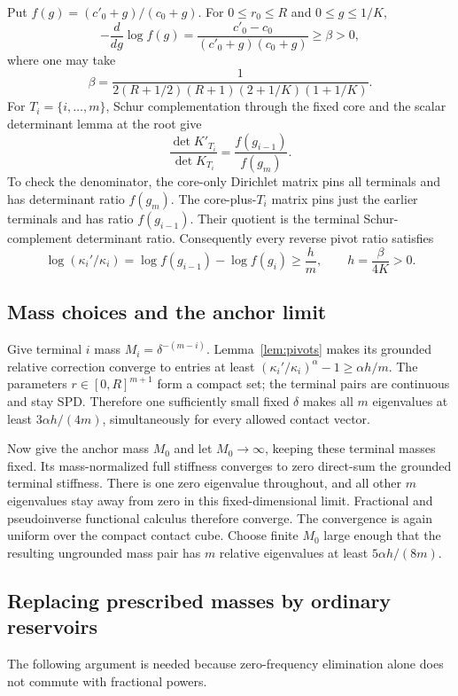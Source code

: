 \documentclass[11pt]{article}
\begin{document}
Put $f(g)=(c'_0+g)/(c_0+g)$. For $0\le r_0\le R$ and $0\le g\le1/K$,
\[
 -\frac{d}{dg}\log f(g)
  =\frac{c'_0-c_0}{(c'_0+g)(c_0+g)}\ge\beta>0,
\]
where one may take
\[
 \beta=\frac{1}{2(R+1/2)(R+1)(2+1/K)(1+1/K)}.
\]
For $T_i=\{i,\ldots,m\}$, Schur complementation through the fixed
core and the scalar determinant lemma at the root give
\begin{equation}\label{eq:detcircuit}
 \frac{\det K'_{T_i}}{\det K_{T_i}}
       =\frac{f(g_{i-1})}{f(g_m)}.
\end{equation}
To check the denominator, the core-only Dirichlet matrix pins all
terminals and has determinant ratio $f(g_m)$. The core-plus-$T_i$
matrix pins just the earlier terminals and has ratio $f(g_{i-1})$.
Their quotient is the terminal Schur-complement determinant ratio.
Consequently every reverse pivot ratio satisfies
\begin{equation}\label{eq:pivotbound}
 \log(\kappa_i'/\kappa_i)
 =\log f(g_{i-1})-\log f(g_i)\ge\frac{h}{m},\qquad h=\frac\beta{4K}>0.
\end{equation}

\subsection{Mass choices and the anchor limit}
Give terminal $i$ mass $M_i=\delta^{-(m-i)}$.
Lemma~\ref{lem:pivots} makes its grounded relative correction converge
to entries at least
$(\kappa_i'/\kappa_i)^\alpha-1\ge\alpha h/m$.
The parameters $r\in[0,R]^{m+1}$ form a compact set; the terminal pairs
are continuous and stay SPD. Therefore one sufficiently small fixed
$\delta$ makes all $m$ eigenvalues at least $3\alpha h/(4m)$,
simultaneously for every allowed contact vector.

Now give the anchor mass $M_0$ and let $M_0\to\infty$, keeping these
terminal masses fixed. Its mass-normalized full stiffness converges
to zero direct-sum the grounded terminal stiffness. There is one zero
eigenvalue throughout, and all other $m$ eigenvalues stay away from
zero in this fixed-dimensional limit. Fractional and pseudoinverse
functional calculus therefore converge. The convergence is again
uniform over the compact contact cube. Choose finite $M_0$ large
enough that the resulting ungrounded mass pair has $m$ relative
eigenvalues at least $5\alpha h/(8m)$.

\subsection{Replacing prescribed masses by ordinary reservoirs}
The following argument is needed because zero-frequency elimination
alone does not commute with fractional powers.
\end{document}

